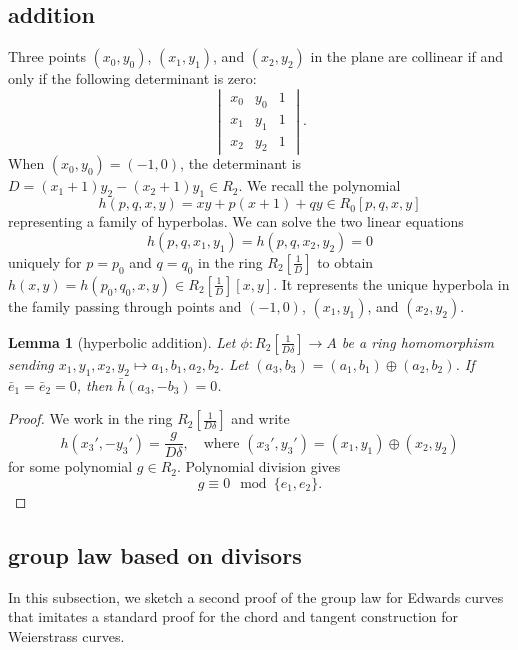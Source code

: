 \documentclass[12pt]{article}
\newtheorem{lemma}[theorem]{Lemma}
\newcommand{\f}[1]{\frac{1}{#1}}
\def\cong{\equiv}
\begin{document}
\subsection{addition}

Three points $(x_0,y_0)$, $(x_1,y_1)$, and $(x_2,y_2)$ in the plane
are collinear if and only if the following determinant is zero:
\[
\begin{vmatrix}
x_0 & y_0 & 1\\
x_1 & y_1 & 1\\
x_2 & y_2 & 1
\end{vmatrix}.
\]
When $(x_0,y_0) = (-1,0)$, the determinant
is $D= (x_1+1) y_2 - (x_2+1) y_1\in R_2$. 
We recall the polynomial
\[
h(p,q,x,y) = x y + p (x+1) + q y \in R_0[p,q,x,y]
\]
representing a family of hyperbolas.
We can solve the two linear equations
\begin{equation}\label{eqn:pq}
h(p,q,x_1,y_1)=h(p,q,x_2,y_2)=0
\end{equation}
uniquely for $p=p_0$ and $q=q_0$ in the ring $R_2[\f{D}]$ to obtain
$h(x,y) = h(p_0,q_0,x,y) \in R_2[\f{D}][x,y]$.  It represents the
unique hyperbola in the family passing through points and $(-1,0)$,
$(x_1,y_1)$, and $(x_2,y_2)$.
 
\begin{lemma}[hyperbolic addition]\label{lemma:hyperbola}
  Let $\phi:R_2[\f{D\delta}]\to A$ be a ring homomorphism sending
  $x_1,y_1,x_2,y_2\mapsto a_1,b_1,a_2,b_2$.  Let $(a_3,b_3) =
  (a_1,b_1)\oplus (a_2,b_2)$.  If $\bar e_1 = \bar e_2 = 0$, then
  $\bar h(a_3,-b_3) = 0$.
\end{lemma}

\begin{proof}
  We work in the ring $R_2[\f{D\delta}]$ and write
\[
h(x_3',-y_3') = \frac{g}{D\delta},\quad 
\text{where } (x_3',y_3') = (x_1,y_1)\oplus (x_2,y_2)
\]
for some polynomial $g \in R_2$.  Polynomial division gives
\begin{equation}\label{eqn:h}
g \cong 0 \mod \{e_1,e_2\}.
\end{equation}
\end{proof}

\subsection{group law based on divisors}

In this subsection, we sketch a second proof of the group law for
Edwards curves that imitates a standard proof for the chord and
tangent construction for Weierstrass curves.
\end{document}

